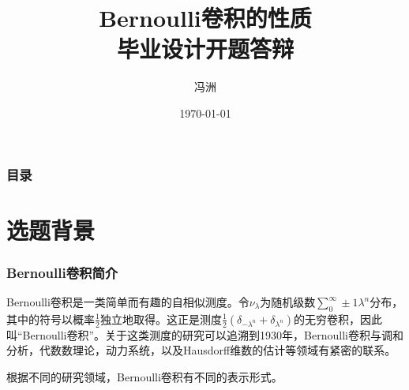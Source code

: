 \documentclass{beamer}
\title[开题答辩]{Bernoulli卷积的性质 \\ \small{毕业设计开题答辩}} %
\author{冯洲} %
\institute[HUST] %
{
华中科技大学 \\ %
\medskip
\textit{U201510104@hust.edu.cn} %
}
\date{\today} %
\numberwithin{equation}{section}
\theoremstyle{definition} \newtheorem{law}[thm]{Law}
\theoremstyle{plain} \newtheorem{jury}[thm]{Jury}
\theoremstyle{remark} \newtheorem*{marg}{Margaret}
\newcommand{\pmone}{\pm1}
\begin{document}
\begin{frame}
\titlepage %
\end{frame}


\begin{frame}
\frametitle{目录} %
\tableofcontents %
\end{frame}


\section{选题背景} %


\begin{frame}
\frametitle{Bernoulli卷积简介}\small
Bernoulli卷积是一类简单而有趣的自相似测度。令$ \nu_{\lambda} $为随机级数$ \sum_{0}^{\infty} \pmone\lambda^{n} $分布，其中的符号以概率$ \frac{1}{2} $独立地取得。这正是测度$ \frac{1}{2}(\delta_{-\lambda^{n}}+\delta_{\lambda^{n}}) $的无穷卷积，因此叫``Bernoulli卷积''。关于这类测度的研究可以追溯到1930年，Bernoulli卷积与调和分析，代数数理论，动力系统，以及Hausdorff维数的估计等领域有紧密的联系。


根据不同的研究领域，Bernoulli卷积有不同的表示形式。\cite{Sixtyyears}

\end{frame}
\end{document}
